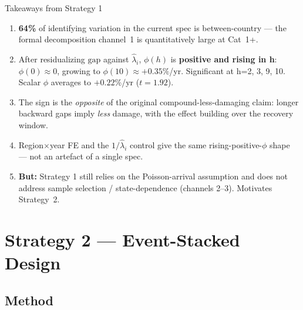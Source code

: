 \documentclass[aspectratio=169]{beamer}
\begin{document}
\begin{frame}{Takeaways from Strategy 1}
\begin{enumerate}
  \item \textbf{64\%} of identifying variation in the current spec is between-country --- the formal decomposition channel~1 is quantitatively large at Cat~1+.

  \medskip
  \item After residualizing $\mathrm{gap}$ against $\hat\lambda_i$, $\phi(h)$ is \textbf{positive and rising in h}: $\phi(0) \approx 0$, growing to $\phi(10) \approx +0.35\%$/yr. Significant at h=2, 3, 9, 10. Scalar $\phi$ averages to $+0.22\%$/yr ($t=1.92$).

  \medskip
  \item The sign is the \emph{opposite} of the original compound-less-damaging claim: longer backward gaps imply \emph{less} damage, with the effect building over the recovery window.

  \medskip
  \item Region$\times$year FE and the $1/\hat\lambda_i$ control give the same rising-positive-$\phi$ shape --- not an artefact of a single spec.

  \medskip
  \item \textbf{But:} Strategy 1 still relies on the Poisson-arrival assumption and does not address sample selection / state-dependence (channels 2--3). Motivates Strategy~2.
\end{enumerate}
\end{frame}

\section{Strategy 2 --- Event-Stacked Design}
\begin{frame}\sectionpage\end{frame}

\subsection{Method}
\begin{frame}\subsectionpage\end{frame}
\end{document}
